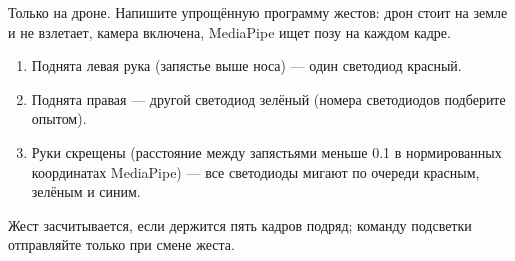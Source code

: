 \begin{taskbox}[Джедай]
Только на дроне. Напишите упрощённую программу жестов: дрон стоит на земле и не взлетает, камера включена, MediaPipe ищет позу на каждом кадре.
\begin{enumerate}
    \item Поднята левая рука (запястье выше носа) --- один светодиод красный.
    \item Поднята правая --- другой светодиод зелёный (номера светодиодов подберите опытом).
    \item Руки скрещены (расстояние между запястьями меньше 0.1 в нормированных координатах MediaPipe) --- все светодиоды мигают по очереди красным, зелёным и синим.
\end{enumerate}
Жест засчитывается, если держится пять кадров подряд; команду подсветки отправляйте только при смене жеста.
\end{taskbox}
